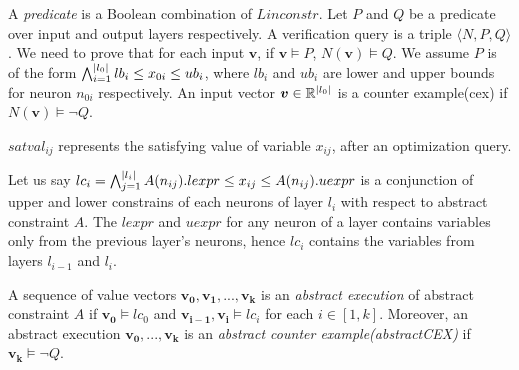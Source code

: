 A {\em predicate} is a Boolean combination of $Linconstr$.
Let $P$ and $Q$ be a predicate over input and output layers respectively.
A verification query is a triple $\langle N, P, Q \rangle$.
We need to prove that for each input $\boldsymbol{v}$,
if $\boldsymbol{v} \models P$, $N(\boldsymbol{v}) \models Q$.
We assume $P$ is of the form
$\bigwedge_{i=1}^{|l_0|}lb_i \leq x_{0i} \leq ub_i$, where $lb_i$ and $ub_i$ are lower and upper bounds for neuron $n_{0i}$ respectively.
An input vector $\boldsymbol{v} \in \mathbb{R}^{|l_0|}$ is a counter example(cex) if $N(\boldsymbol{v}) \models \lnot Q$.  



$satval_{ij}$ represents the satisfying value of variable $x_{ij}$, after an optimization query.






Let us say $lc_i = \bigwedge_{j=1}^{|l_i|} A(n_{ij}).lexpr \leq x_{ij} \leq  A(n_{ij}).uexpr$ is a 
conjunction of upper and lower constrains of each neurons of layer $l_i$ with respect to abstract constraint $A$.
The $lexpr$ and $uexpr$ for any neuron of a layer contains variables only from the previous layer's neurons, 
hence $lc_i$ contains the variables from layers $l_{i-1}$ and $l_i$. 

\begin{df}
  A sequence of value vectors $\boldsymbol{v_0}, \boldsymbol{v_1}, ... , \boldsymbol{v_k}$ is an 
  {\em abstract execution} of abstract constraint $A$ if 
  $\boldsymbol{v_0} \models lc_0$ and $\boldsymbol{v_{i-1}}, \boldsymbol{v_i} \models lc_i$ for each $i \in [1,k]$.  
 Moreover, an abstract execution $\boldsymbol{v_0,...,v_k}$ is
 an {\em abstract counter example(abstractCEX)} if $\boldsymbol{v_k} \models \lnot Q$.
\end{df}



